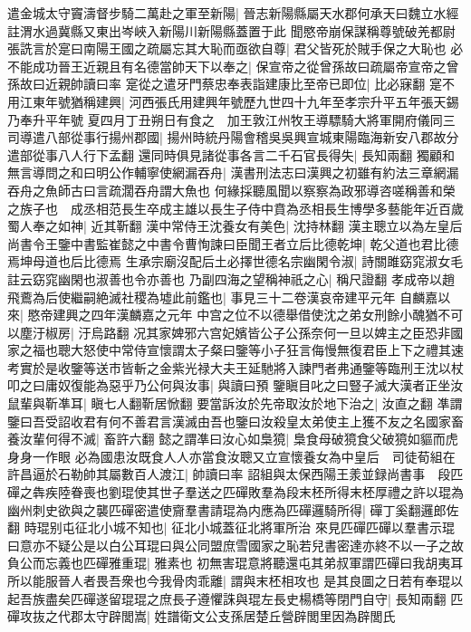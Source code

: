 遣金城太守竇濤督步騎二萬赴之軍至新陽|{
	晉志新陽縣屬天水郡何承天曰魏立水經註渭水過冀縣又東出岑峽入新陽川新陽縣蓋置于此}
聞愍帝崩保謀稱尊號破羌都尉張詵言於寔曰南陽王國之疏屬忘其大恥而亟欲自尊|{
	君父皆死於賊手保之大恥也}
必不能成功晉王近親且有名德當帥天下以奉之|{
	保宣帝之從曾孫故曰疏屬帝宣帝之曾孫故曰近親帥讀曰率}
寔從之遣牙門蔡忠奉表詣建康比至帝已即位|{
	比必寐翻}
寔不用江東年號猶稱建興|{
	河西張氏用建興年號歷九世四十九年至孝宗升平五年張天錫乃奉升平年號}
夏四月丁丑朔日有食之　加王敦江州牧王導驃騎大將軍開府儀同三司導遣八部從事行揚州郡國|{
	揚州時統丹陽會稽吳吳興宣城東陽臨海新安八郡故分遣部從事八人行下孟翻}
還同時俱見諸從事各言二千石官長得失|{
	長知兩翻}
獨顧和無言導問之和曰明公作輔寧使網漏吞舟|{
	漢書刑法志曰漢興之初雖有約法三章網漏吞舟之魚師古曰言疏濶吞舟謂大魚也}
何緣採聽風聞以察察為政邪導咨嗟稱善和榮之族子也　成丞相范長生卒成主雄以長生子侍中賁為丞相長生博學多藝能年近百歲蜀人奉之如神|{
	近其靳翻}
漢中常侍王沈養女有美色|{
	沈持林翻}
漢主聰立以為左皇后尚書令王鑒中書監崔懿之中書令曹恂諫曰臣聞王者立后比德乾坤|{
	乾父道也君比德焉坤母道也后比德焉}
生承宗廟沒配后土必擇世德名宗幽閑令淑|{
	詩關雎窈窕淑女毛註云窈窕幽閑也淑善也令亦善也}
乃副四海之望稱神祇之心|{
	稱尺證翻}
孝成帝以趙飛鷰為后使繼嗣絶滅社稷為墟此前鑑也|{
	事見三十二卷漢哀帝建平元年}
自麟嘉以來|{
	愍帝建興之四年漢麟嘉之元年}
中宫之位不以德舉借使沈之弟女刑餘小醜猶不可以塵汙椒房|{
	汙烏路翻}
况其家婢邪六宫妃嬪皆公子公孫奈何一旦以婢主之臣恐非國家之福也聰大怒使中常侍宣懷謂太子粲曰鑒等小子狂言侮慢無復君臣上下之禮其速考實於是收鑒等送市皆斬之金紫光禄大夫王延馳將入諫門者弗通鑒等臨刑王沈以杖叩之曰庸奴復能為惡乎乃公何與汝事|{
	與讀曰預}
鑒瞋目叱之曰豎子滅大漢者正坐汝鼠輩與靳凖耳|{
	瞋七人翻靳居惞翻}
要當訴汝於先帝取汝於地下治之|{
	汝直之翻}
凖謂鑒曰吾受詔收君有何不善君言漢滅由吾也鑒曰汝殺皇太弟使主上獲不友之名國家畜養汝輩何得不滅|{
	畜許六翻}
懿之謂凖曰汝心如梟獍|{
	梟食母破獍食父破獍如貙而虎身身一作眼}
必為國患汝既食人人亦當食汝聰又立宣懷養女為中皇后　司徒荀組在許昌逼於石勒帥其屬數百人渡江|{
	帥讀曰率}
詔組與太保西陽王羕並録尚書事　段匹磾之犇疾陸眷喪也劉琨使其世子羣送之匹磾敗羣為段末柸所得末柸厚禮之許以琨為幽州刺史欲與之襲匹磾密遣使齎羣書請琨為内應為匹磾邏騎所得|{
	磾丁奚翻邏郎佐翻}
時琨别屯征北小城不知也|{
	征北小城蓋征北將軍所治}
來見匹磾匹磾以羣書示琨曰意亦不疑公是以白公耳琨曰與公同盟庶雪國家之恥若兒書密達亦終不以一子之故負公而忘義也匹磾雅重琨|{
	雅素也}
初無害琨意將聽還屯其弟叔軍謂匹磾曰我胡夷耳所以能服晉人者畏吾衆也今我骨肉乖離|{
	謂與末柸相攻也}
是其良圖之日若有奉琨以起吾族盡矣匹磾遂留琨琨之庶長子遵懼誅與琨左長史楊橋等閉門自守|{
	長知兩翻}
匹磾攻抜之代郡太守辟閭嵩|{
	姓譜衛文公支孫居楚丘營辟閭里因為辟閭氏}
